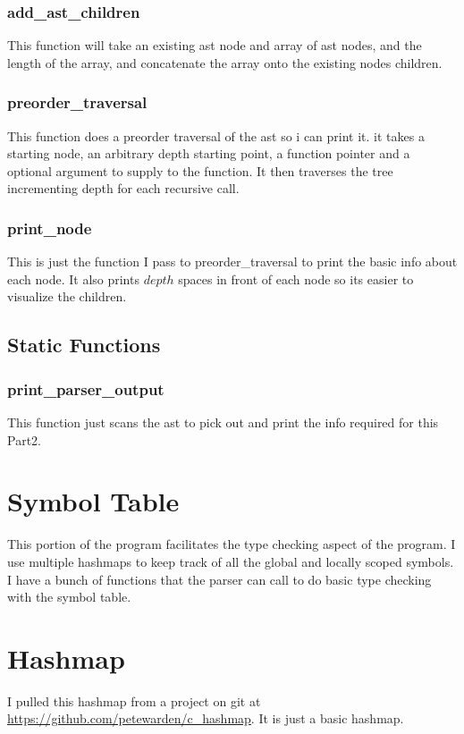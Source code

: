 \documentclass[11pt]{article}
\begin{document}
            \subsubsection{add\_ast\_children}
                This function will take an existing ast node and array of ast nodes, and the
                length of the array, and concatenate the array onto the existing nodes children.

            \subsubsection{preorder\_traversal}
                This function does a preorder traversal of the ast so i can print it. it takes a starting node,
                an arbitrary depth starting point, a function pointer and a optional argument to supply to the
                function. It then traverses the tree incrementing depth for each recursive call.

            \subsubsection{print\_node}
                This is just the function I pass to preorder\_traversal to print the basic info about each node.
                It also prints $depth$ spaces in front of each node so its easier to visualize the children.

        \subsection{Static Functions}

            \subsubsection{print\_parser\_output}
                This function just scans the ast to pick out and print the info required for this Part2.

    \section{Symbol Table}

        This portion of the program facilitates the type checking aspect of the program.
        I use multiple hashmaps to keep track of all the global and locally scoped symbols.
        I have a bunch of functions that the parser can call to do basic type checking with the
        symbol table.

    \section{Hashmap}
        I pulled this hashmap from a project on git at \url{https://github.com/petewarden/c\_hashmap}.
        It is just a basic hashmap.
\end{document}
